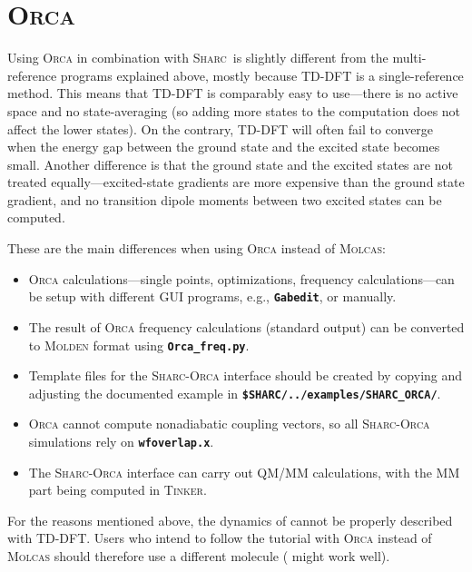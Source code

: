 \documentclass[a4paper,11pt,DIV=15,openany]{scrbook}
\makeatletter
\newcommand{\refermanual}[2][rectangle,draw=B,thick,fill=black!5,inner sep=1pt,outer sep=0pt,rounded corners]{\marginpar{\tikz[baseline=(current bounding box.north)]\node at (0,0) [#1]{\begin{tabular}{@{}l@{}}See\\ section\\ \ref*{#2}\\ (p. \pageref*{#2})\\ in the\\ manual.\end{tabular}};}}
\newcommand{\sharc}{\textsc{Sharc}}
\newcommand{\ttt}[1]{\textbf{\texttt{#1}}}
\makeatother
\begin{document}

\section{\textsc{Orca}}
\refermanual{m-sec:int:orca}

Using \textsc{Orca} in combination with \sharc\ is slightly different from the multi-reference programs explained above, mostly because TD-DFT is a single-reference method.
This means that TD-DFT is comparably easy to use---there is no active space and no state-averaging (so adding more states to the computation does not affect the lower states).
On the contrary, TD-DFT will often fail to converge when the energy gap between the ground state and the excited state becomes small.
Another difference is that the ground state and the excited states are not treated equally---excited-state gradients are more expensive than the ground state gradient, and no transition dipole moments between two excited states can be computed.

These are the main differences when using \textsc{Orca} instead of \textsc{Molcas}:
\begin{itemize}
  \item \textsc{Orca} calculations---single points, optimizations, frequency calculations---can be setup with different GUI programs, e.g., \ttt{Gabedit}, or manually.
  \item The result of \textsc{Orca} frequency calculations (standard output) can be converted to \textsc{Molden} format using \ttt{Orca\_freq.py}.
  \item Template files for the \sharc-\textsc{Orca} interface should be created by copying and adjusting the documented example in \ttt{\$SHARC/../examples/SHARC\_ORCA/}.
  \item \textsc{Orca} cannot compute nonadiabatic coupling vectors, so all \sharc-\textsc{Orca} simulations rely on \ttt{wfoverlap.x}.
  \item The \sharc-\textsc{Orca} interface can carry out QM/MM calculations, with the MM part being computed in \textsc{Tinker}.
\end{itemize}

For the reasons mentioned above, the dynamics of  cannot be properly described with TD-DFT.
Users who intend to follow the tutorial with \textsc{Orca} instead of \textsc{Molcas} should therefore use a different molecule ( might work well).
\end{document}
